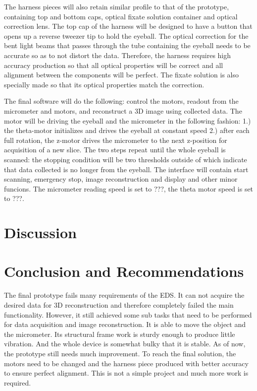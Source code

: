 \documentclass{article}
\begin{document}
The harness pieces will also retain similar profile to that of the prototype, containing top and bottom caps, optical fixate solution container and optical correction lens. The top cap of the harness will be designed to have a button that opens up a reverse tweezer tip to hold the eyeball. The optical correction for the bent light beams that passes through the tube containing the eyeball needs to be accurate so as to not distort the data. Therefore, the harness requires high accuracy production so that all optical properties will be correct and all alignment between the components will be perfect. The fixate solution is also specially made so that its optical properties match the correction.

The final software will do the following: control the motors, readout from the micrometer and motors, and 
reconstruct a 3D image using collected data. The motor will be driving the eyeball and the micrometer in 
the following fashion: 1.) the theta-motor initializes and drives the eyeball at constant speed 2.) after each 
full rotation, the z-motor drives the micrometer to the next z-position for acquisition of a new slice. The two 
steps repeat until the whole eyeball is scanned: the stopping condition will be two thresholds outside of 
which indicate that data collected is no longer from the eyeball. The interface will contain start scanning, emergency stop, image reconstruction and display and other minor funcions. The micrometer reading speed is set to ???, the theta motor speed is set to ???.



\section{Discussion}
\label{sec:discussion}

\section{Conclusion and Recommendations}
\label{sec:concl-recomm}

The final prototype fails many requirements of the EDS. It can not acquire the desired data for 3D 
reconstruction and therefore completely failed the main functionality. However, it still achieved some sub 
tasks that need to be performed for data acquisition and image reconstruction. It is able to move the object 
and the micrometer. Its structural frame work is sturdy enough to produce little vibration. And the whole 
device is somewhat bulky that it is stable. As of now, the prototype still needs much improvement. To 
reach the final solution, the motors need to be changed and the harness piece produced with better 
accuracy to ensure perfect alignment. This is not a simple project and much more work is required.
\end{document}
